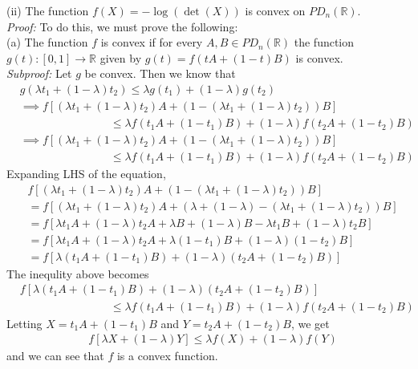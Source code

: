 \documentclass[letterpaper,12pt]{article}
\theoremstyle{definition}
\begin{document}
(ii) The function $f(X) = - \log(\det(X))$ is convex on $PD_n(\mathbb{R})$. \\
\textit{Proof:}
To do this, we must prove the following: \\
(a) The function $f$ is convex if for every $A, B \in PD_n(\mathbb{R})$ the function $g(t): [0,1] \to \mathbb{R}$ given by $g(t) = f(tA +(1-t)B)$ is convex.\\
\textit{Subproof:}
Let $g$ be convex. Then we know that
\begin{align*}
  &g(\lambda t_1 + (1-\lambda)t_2) \leq \lambda g(t_1) + (1 - \lambda)g(t_2)
  \\
  &\implies f[(\lambda t_1 + (1-\lambda)t_2)A + (1 - (\lambda t_1 + (1-\lambda)t_2))B]
  \\
  &\qquad \qquad \qquad \qquad \leq \lambda f(t_1 A + (1-t_1)B) + (1 - \lambda)f(t_2 A + (1-t_2)B)
  \\
  &\implies f[(\lambda t_1 + (1-\lambda)t_2)A + (1 - (\lambda t_1 + (1-\lambda)t_2))B] \\
  &\qquad \qquad \qquad \qquad \leq \lambda f(t_1 A + (1-t_1)B) + (1 - \lambda)f(t_2 A + (1-t_2)B)
\end{align*}
Expanding LHS of the equation,
\begin{align*}
  &f[(\lambda t_1 + (1-\lambda)t_2)A + (1 - (\lambda t_1 + (1-\lambda)t_2))B]
  \\
  &= f[(\lambda t_1 + (1-\lambda)t_2)A + (\lambda + (1 - \lambda) - (\lambda t_1 + (1-\lambda)t_2))B]
  \\
  &= f[\lambda t_1 A + (1-\lambda) t_2 A + \lambda B + (1 - \lambda)B - \lambda t_1 B + (1-\lambda) t_2 B]
  \\
  &= f[\lambda t_1 A + (1-\lambda) t_2 A + \lambda (1 - t_1) B + (1 - \lambda) (1 - t_2) B] \\
  &= f[\lambda (t_1 A + (1 - t_1) B) + (1-\lambda)(t_2 A + (1 - t_2) B)]
\end{align*}
The inequlity above becomes
\begin{align*}
  &f[\lambda (t_1 A + (1 - t_1) B) + (1-\lambda)(t_2 A + (1 - t_2) B)] \\
  &\qquad \qquad \qquad \qquad \leq \lambda f(t_1 A + (1-t_1)B) + (1 - \lambda)f(t_2 A + (1-t_2)B)
\end{align*}
Letting $X = t_1 A + (1 - t_1) B$ and $Y = t_2 A + (1 - t_2) B$, we get
\begin{align*}
  &f[\lambda X + (1-\lambda)Y]
  \leq \lambda f(X) + (1 - \lambda)f(Y)
\end{align*}
and we can see that $f$ is a convex function. \\
\end{document}
